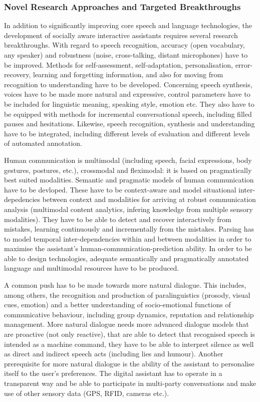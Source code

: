 \documentclass[10pt, plain]{../../metanetpaper}
\begin{document}
\begin{multicols}{2}
\subsubsection{Novel Research Approaches and Targeted Breakthroughs}
\label{sec:novel-rese-appr-pt3}

In addition to significantly improving core speech and language technologies, the development of socially aware interactive assistants requires several research breakthroughs. With regard to speech recognition, accuracy (open vocabulary, any speaker) and robustness (noise, cross-talking, distant microphones) have to be improved. Methods for self-assessment, self-adaptation, personalisation, error-recovery, learning and forgetting information, and also for moving from recognition to understanding have to be developed. Concerning speech synthesis, voices have to be made more natural and expressive, control parameters have to be included for linguistic meaning, speaking style, emotion etc. They also have to be equipped with methods for incremental conversational speech, including filled pauses and hesitations. Likewise, speech recognition, synthesis and understanding have to be integrated, including different levels of evaluation and different levels of automated annotation.

Human communication is multimodal (including speech, facial expressions, body gestures, postures, etc.), crossmodal and fleximodal: it is based on pragmatically best suited modalities. Semantic and pragmatic models of human communication have to be devloped. These have to be context-aware and model situational inter-depedencies between context and modalities for arriving at robust communication analysis (multimodal content analytics, infering knowledge from multiple sensory modalities). They have to be able to detect and recover interactively from mistakes, learning continuously and incrementally from the mistakes. Parsing has to model temporal inter-dependencies within and between modalities in order to maximise the assistant's human-communication-prediction ability. In order to be able to design technologies, adequate semantically and pragmatically annotated language and multimodal resources have to be produced.

A common push has to be made towards more natural dialogue. This includes, among others, the recognition and production of paralinguistics (prosody, visual cues, emotion) and a better understanding of socio-emotional functions of communicative behaviour, including group dynamics, reputation and relationship management. More natural dialogue needs more advanced dialogue models that are proactive (not only reactive), that are able to detect that recognised speech is intended as a machine command, they have to be able to interpret silence as well as direct and indirect speech acts (including lies and humour). Another prerequisite for more natural dialogue is the ability of the assistant to personalise itself to the user's preferences. The digital assistant has to operate in a transparent way and be able to participate in multi-party conversations and make use of other sensory data (GPS, RFID, cameras etc.).


\end{multicols}
\end{document}

